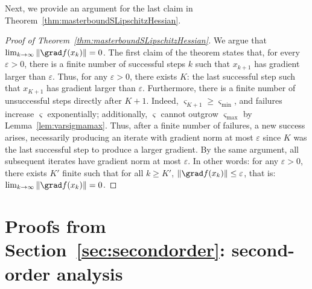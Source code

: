 Next, we provide an argument for the last claim in Theorem~\ref{thm:masterboundSLipschitzHessian}.
\begin{proof}[Proof of Theorem~\ref{thm:masterboundSLipschitzHessian}]
	We argue that $\lim_{k \to \infty} \|\grad f(x_k)\| = 0$. The first claim of the theorem states that, for every $\varepsilon > 0$, there is a finite number of successful steps $k$ such that $x_{k+1}$ has gradient larger than $\varepsilon$. Thus, for any $\varepsilon > 0$, there exists $K$: the last successful step such that $x_{K+1}$ has gradient larger than $\varepsilon$. Furthermore, there is a finite number of unsuccessful steps directly after $K+1$. Indeed, $\varsigma_{K+1} \geq \varsigma_{\min}$, and failures increase $\varsigma$ exponentially; additionally, $\varsigma$ cannot outgrow $\varsigma_{\max}$ by Lemma~\ref{lem:varsigmamax}. Thus, after a finite number of failures, a new success arises, necessarily producing an iterate with gradient norm at most $\varepsilon$ since $K$ was the last successful step to produce a larger gradient. By the same argument, all subsequent iterates have gradient norm at most $\varepsilon$. In other words: for any $\varepsilon > 0$, there exists $K'$ finite such that for all $k \geq K'$, $\|\grad f(x_k)\| \leq \varepsilon$, that is: $\lim_{k\to\infty} \|\grad f(x_k)\| = 0$.
\end{proof}







\section{Proofs from Section~\ref{sec:secondorder}: second-order analysis} \label{app:secondorder}


